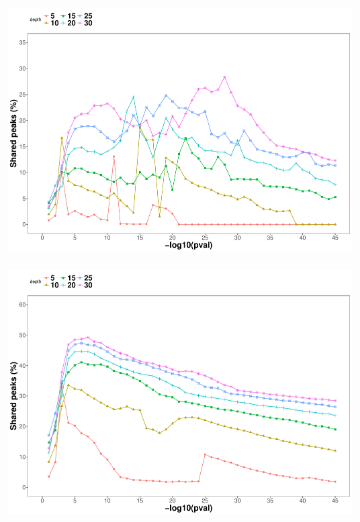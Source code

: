 \begin{figure}[htbp]
\centering
\begin{subfigure}{0.5\textwidth}
\centering
\includegraphics[width=\textwidth]{./Results1/pdfs/ATAC_Core_fresh_CTL2_CD4_shared_peaks_IDR_vs_pval}
\caption{\textbf{}}
\end{subfigure}%
\begin{subfigure}{0.5\textwidth}
\centering
\includegraphics[width=\textwidth]{./Results1/pdfs/ATAC_Core_fresh_CTL2_CD14_shared_peaks_IDR_vs_pval}
\caption{\textbf{}}
\end{subfigure} \\
\begin{subfigure}{0.5\textwidth}
\centering

\end{subfigure}
\end{figure}

